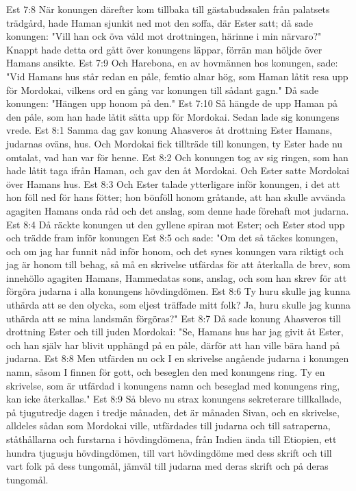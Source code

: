 Est 7:8  När konungen därefter kom tillbaka till gästabudssalen från palatsets trädgård, hade Haman sjunkit ned mot den soffa, där Ester satt; då sade konungen: "Vill han ock öva våld mot drottningen, härinne i min närvaro?" Knappt hade detta ord gått över konungens läppar, förrän man höljde över Hamans ansikte.
Est 7:9  Och Harebona, en av hovmännen hos konungen, sade: "Vid Hamans hus står redan en påle, femtio alnar hög, som Haman låtit resa upp för Mordokai, vilkens ord en gång var konungen till sådant gagn." Då sade konungen: "Hängen upp honom på den."
Est 7:10  Så hängde de upp Haman på den påle, som han hade låtit sätta upp för Mordokai. Sedan lade sig konungens vrede.
Est 8:1  Samma dag gav konung Ahasveros åt drottning Ester Hamans, judarnas oväns, hus. Och Mordokai fick tillträde till konungen, ty Ester hade nu omtalat, vad han var för henne.
Est 8:2  Och konungen tog av sig ringen, som han hade låtit taga ifrån Haman, och gav den åt Mordokai. Och Ester satte Mordokai över Hamans hus.
Est 8:3  Och Ester talade ytterligare inför konungen, i det att hon föll ned för hans fötter; hon bönföll honom gråtande, att han skulle avvända agagiten Hamans onda råd och det anslag, som denne hade förehaft mot judarna.
Est 8:4  Då räckte konungen ut den gyllene spiran mot Ester; och Ester stod upp och trädde fram inför konungen
Est 8:5  och sade: "Om det så täckes konungen, och om jag har funnit nåd inför honom, och det synes konungen vara riktigt och jag är honom till behag, så må en skrivelse utfärdas för att återkalla de brev, som innehöllo agagiten Hamans, Hammedatas sons, anslag, och som han skrev för att förgöra judarna i alla konungens hövdingdömen.
Est 8:6  Ty huru skulle jag kunna uthärda att se den olycka, som eljest träffade mitt folk? Ja, huru skulle jag kunna uthärda att se mina landsmän förgöras?"
Est 8:7  Då sade konung Ahasveros till drottning Ester och till juden Mordokai: "Se, Hamans hus har jag givit åt Ester, och han själv har blivit upphängd på en påle, därför att han ville bära hand på judarna.
Est 8:8  Men utfärden nu ock I en skrivelse angående judarna i konungen namn, såsom I finnen för gott, och beseglen den med konungens ring. Ty en skrivelse, som är utfärdad i konungens namn och beseglad med konungens ring, kan icke återkallas."
Est 8:9  Så blevo nu strax konungens sekreterare tillkallade, på tjugutredje dagen i tredje månaden, det är månaden Sivan, och en skrivelse, alldeles sådan som Mordokai ville, utfärdades till judarna och till satraperna, ståthållarna och furstarna i hövdingdömena, från Indien ända till Etiopien, ett hundra tjugusju hövdingdömen, till vart hövdingdöme med dess skrift och till vart folk på dess tungomål, jämväl till judarna med deras skrift och på deras tungomål.
